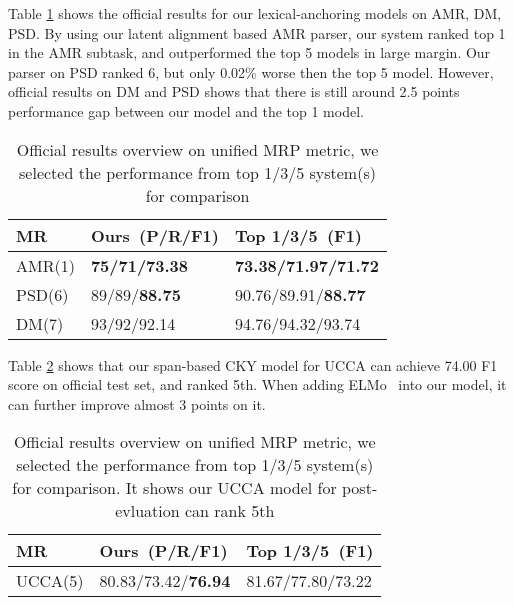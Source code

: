 Table \ref{tbl:results_rank} shows the official results for our
lexical-anchoring models on AMR, DM, PSD.  By using our latent
alignment based AMR parser, our system ranked top 1 in the AMR subtask,
and outperformed the top 5 models in large margin. Our parser on PSD
ranked 6, but only 0.02\% worse then the top 5 model. However, official
results on DM and PSD shows that there is still around 2.5 points
performance gap between our model and the top 1 model.

\begin{table}[!h]
\caption{\label{tbl:results_rank} Official results overview on unified MRP metric, we selected the performance from top 1/3/5 system(s) for comparison}
\centering
\begin{tabular}{lll}
\toprule
MR     & Ours~(P/R/F1) & Top 1/3/5~(F1)  \\ \hline
AMR(1) & {\bf 75/71/73.38}   & {\bf 73.38/71.97/71.72} \\
PSD(6) & 89/89/{\bf 88.75}   & 90.76/89.91/{\bf 88.77} \\
DM(7)  & 93/92/92.14   & 94.76/94.32/93.74 \\ \hline
\end{tabular}
\end{table}

 Table
\ref{tbl:ucca_results_rank} shows that our span-based CKY model for
UCCA can achieve 74.00 F1 score on official test set, and ranked
5th. When adding ELMo~\cite{peters2018deep} into our model, it can further improve almost 3
points on it.
\begin{table}[!h]
  \small
\centering
\begin{tabular}{lll}
\toprule
MR     & Ours~(P/R/F1) & Top 1/3/5~(F1)  \\ \hline
UCCA(5)   & 80.83/73.42/\textbf{76.94}   & 81.67/77.80/73.22 \\
\end{tabular}
\caption{\label{tbl:ucca_results_rank} Official results overview on
  unified MRP metric, we selected the performance from top 1/3/5
  system(s) for comparison. It shows our UCCA model for post-evluation
  can rank 5th}
\end{table}


